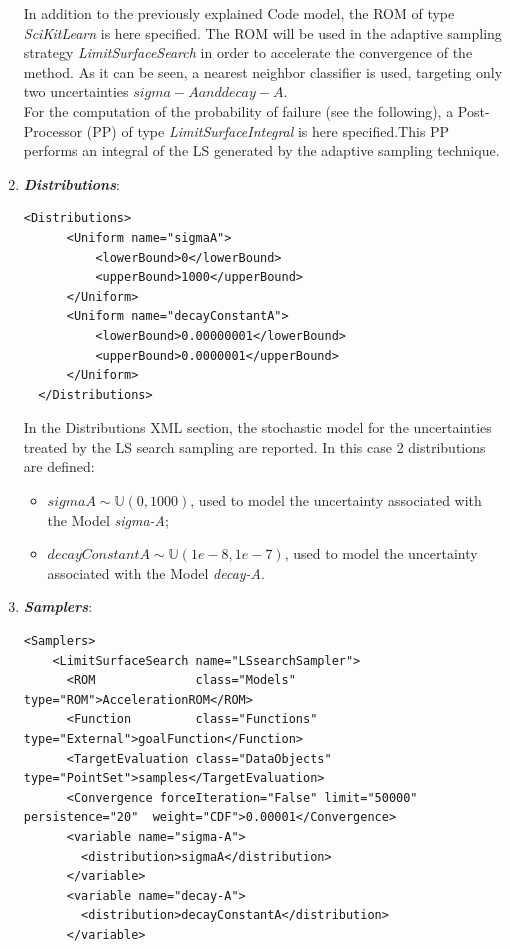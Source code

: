 \begin{enumerate}
 In addition to the previously explained Code 
 model,
 the ROM of type \textit{SciKitLearn} is here specified. The ROM will be
 used in the adaptive sampling strategy \textit{LimitSurfaceSearch} in
 order to accelerate the convergence of the method. As it can be seen,
 a nearest neighbor classifier is used, targeting only two uncertainties 
 $sigma-A and decay-A$.
 \\ For the computation of the probability of failure (see the following), a 
 Post-Processor (PP) of type \textit{LimitSurfaceIntegral} is here 
 specified.This PP performs an integral of the LS 
 generated by the adaptive sampling technique. 
   \item \textbf{\textit{Distributions}}:
\begin{lstlisting}[style=XML]
  <Distributions>
      <Uniform name="sigmaA">
          <lowerBound>0</lowerBound>
          <upperBound>1000</upperBound>
      </Uniform>
      <Uniform name="decayConstantA">
          <lowerBound>0.00000001</lowerBound>
          <upperBound>0.0000001</upperBound>
      </Uniform>
  </Distributions>
\end{lstlisting}
  In the Distributions XML section, the stochastic model for the 
  uncertainties  treated by the LS search sampling are reported. In 
  this case 2 distributions are defined: 
  \begin{itemize}
    \item $sigmaA \sim \mathbb{U}(0,1000)$, used to model the uncertainty 
    associated with  the Model \textit{sigma-A};
    \item  $decayConstantA \sim \mathbb{U}(1e-8,1e-7)$,  used to 
    model the uncertainty 
    associated with  the Model \textit{decay-A}.
  \end{itemize}
   \item \textbf{\textit{Samplers}}:
\begin{lstlisting}[style=XML,morekeywords={arg,extension,pauseAtEnd,overwrite}]
  <Samplers>
    <LimitSurfaceSearch name="LSsearchSampler">
      <ROM              class="Models"      type="ROM">AccelerationROM</ROM>
      <Function         class="Functions"   type="External">goalFunction</Function>
      <TargetEvaluation class="DataObjects" type="PointSet">samples</TargetEvaluation>
      <Convergence forceIteration="False" limit="50000" persistence="20"  weight="CDF">0.00001</Convergence>
      <variable name="sigma-A">
        <distribution>sigmaA</distribution>
      </variable>
      <variable name="decay-A">
        <distribution>decayConstantA</distribution>
      </variable>

\end{lstlisting}
\end{enumerate}
